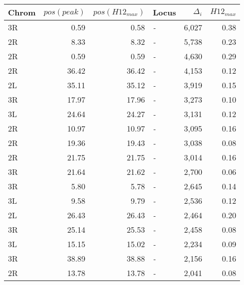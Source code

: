 \begin{tabular}{lrrlrr}
\toprule
Chrom & $pos(peak)$ & $pos(H12_{max})$ &       Locus & $\Delta_{i}$ & $H12_{max}$ \\
\midrule
   3R &        0.59 &             0.58 &  \textit{-} &        6,027 &        0.38 \\
   2R &        8.33 &             8.32 &  \textit{-} &        5,738 &        0.23 \\
   2R &        0.59 &             0.59 &  \textit{-} &        4,630 &        0.29 \\
   2R &       36.42 &            36.42 &  \textit{-} &        4,153 &        0.12 \\
   2L &       35.11 &            35.12 &  \textit{-} &        3,919 &        0.15 \\
   3R &       17.97 &            17.96 &  \textit{-} &        3,273 &        0.10 \\
   3L &       24.64 &            24.27 &  \textit{-} &        3,131 &        0.12 \\
   2R &       10.97 &            10.97 &  \textit{-} &        3,095 &        0.16 \\
   2R &       19.36 &            19.43 &  \textit{-} &        3,038 &        0.08 \\
   2R &       21.75 &            21.75 &  \textit{-} &        3,014 &        0.16 \\
   3R &       21.64 &            21.62 &  \textit{-} &        2,700 &        0.06 \\
   3R &        5.80 &             5.78 &  \textit{-} &        2,645 &        0.14 \\
   3L &        9.58 &             9.79 &  \textit{-} &        2,536 &        0.12 \\
   2L &       26.43 &            26.43 &  \textit{-} &        2,464 &        0.20 \\
   3R &       25.14 &            25.53 &  \textit{-} &        2,458 &        0.08 \\
   3L &       15.15 &            15.02 &  \textit{-} &        2,234 &        0.09 \\
   3R &       38.89 &            38.88 &  \textit{-} &        2,156 &        0.16 \\
   2R &       13.78 &            13.78 &  \textit{-} &        2,041 &        0.08 \\
\bottomrule
\end{tabular}
